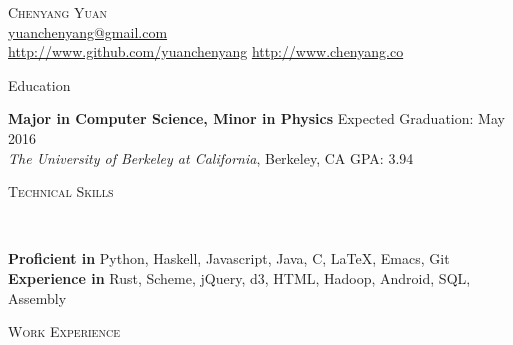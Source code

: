 \documentclass[9pt]{article}
\newenvironment{changemargin}[2]{%
  \begin{list}{}{%
      \setlength{\topsep}{0pt}%
      \setlength{\leftmargin}{#1}%
      \setlength{\rightmargin}{#2}%
      \setlength{\listparindent}{\parindent}%
      \setlength{\itemindent}{\parindent}%
      \setlength{\parsep}{\parskip}%
    }%
  \item[]}{\end{list}
}
\newcommand{\lineover}{
  \begin{changemargin}{-0.05in}{-0.05in}
    \vspace*{-8pt}
    \hrulefill \\
    \vspace*{-2pt}
  \end{changemargin}
}
\newcommand{\header}[1]{
  \begin{changemargin}{-0.5in}{-0.5in}
    \scshape{#1}\\
    \lineover
  \end{changemargin}
}
\newcommand{\contact}[4]{
  \begin{changemargin}{-0.5in}{-0.5in}
    \begin{center}
      {\Large \scshape {#1}}\\ \smallskip
      {#2}\\ \smallskip
      {#3}\\ \smallskip
      {#4}\smallskip
    \end{center}
  \end{changemargin}
}
\newenvironment{body} {
  \vspace*{-16pt}
  \begin{changemargin}{-0.25in}{-0.5in}
  }
  {\end{changemargin}
}
\begin{document}
\contact{Chenyang Yuan}{\href{mailto:yuanchenyang@gmail.com}{yuanchenyang@gmail.com}}{ \url{http://www.github.com/yuanchenyang} \quad \url{http://www.chenyang.co}}

\header{Education}

\begin{body}
  \vspace{14pt}
  \textbf{Major in Computer Science, Minor in Physics} \hfill Expected Graduation: May 2016 \\
  \emph{The University of Berkeley at California}, Berkeley, CA{} \hfill GPA: 3.94 \\
\end{body}

\smallskip

\header{Technical Skills}

\begin{body}
  \vspace{14pt}
  \textbf{Proficient in} Python, Haskell, Javascript, Java,  C, \LaTeX, Emacs, Git \\
  \textbf{Experience in} Rust, Scheme, jQuery, d3, HTML, Hadoop, Android, SQL, Assembly
\end{body}

\smallskip



\header{Work Experience}
\end{document}
